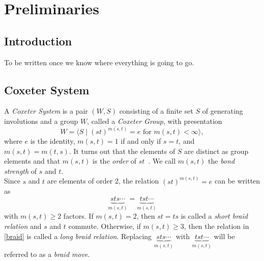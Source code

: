 \chapter{Preliminaries}

\section{Introduction}
To be written once we know where everything is going to go.

\section{Coxeter System}\label{sec:coxeter}
A \emph{Coxeter System} is a pair $(W,S)$ consisting of a finite set $S$ of generating involutions and a group $W$, called a \emph{Coxeter Group}, with presentation 
\[ 
W = \langle S \mid (st)^{m(s, t)} = e \text{ for } m(s, t) < \infty \rangle,
\]
where $e$ is the identity, $m(s,t) = 1$ if and only if $s = t$, and $m(s,t) = m(t,s)$. It turns out that the elements of $S$ are distinct as group elements and that $m(s,t)$ is the \emph\emph{order} of $st$~\cite{Humphreys1990}. We call $m(s,t)$ the \emph{bond strength} of $s$ and $t$.\\

Since $s$ and $t$ are elements of order 2, the relation $(st)^{m(s,t)}=e$ can be written as
\begin{equation}\label{braid} 
	\underbrace{sts \cdots}_{m(s,t)}=\underbrace{tst\cdots}_{m(s,t)}
\end{equation}
with $m(s,t) \geq 2$ factors. If $m(s,t)=2$, then $st=ts$ is called a \emph{short braid relation} and $s$ and $t$ commute. Otherwise, if $m(s,t) \geq 3$, then the relation in \eqref{braid} is called a \emph{long braid relation}. Replacing $\underbrace{sts\cdots}_{m(s,t)}$ with $\underbrace{tst\cdots}_{m(s,t)}$ will be referred to as a \emph{braid move}.\\

